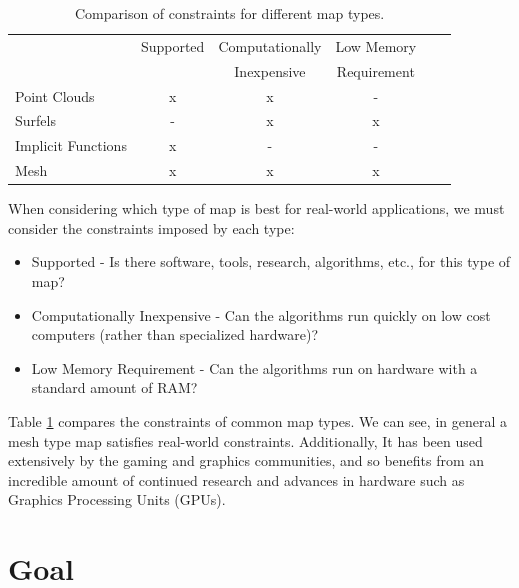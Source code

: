 \begin{table}[h]
  \caption{Comparison of constraints for different map types.}
  \label{tab:rep}
  \begin{footnotesize}
  \begin{center}
    \begin{tabular}{|l|c|c|c|c|c|}
    \hline
    \multirow{2}{*}{}   & Supported & Computationally & Low Memory  \\
                        &           & Inexpensive     & Requirement \\\hline
    Point Clouds		    & x         & x               & -           \\
    Surfels             & -         & x               & x           \\
    Implicit Functions 	& x         & -               & -           \\
    Mesh	 	            & x         & x               & x           \\
    \hline
    \end{tabular}
  \end{center}
  \end{footnotesize}
\end{table}

When considering which type of map is best for real-world applications, we must
consider the constraints imposed by each type:

\begin{itemize}
  \item Supported - Is there software, tools, research, algorithms, etc., for
  this type of map?
  \item Computationally Inexpensive - Can the algorithms run quickly on low cost
  computers (rather than specialized hardware)?
  \item Low Memory Requirement - Can the algorithms run on hardware with
  a standard amount of RAM?
\end{itemize}

Table \ref{tab:rep} compares the constraints of common map types. We can see, in
general a mesh type map satisfies real-world constraints. Additionally, It has
been used extensively by the gaming and graphics communities, and so benefits
from an incredible amount of continued research and advances in hardware such as
Graphics Processing Units (GPUs).

\section{Goal}

